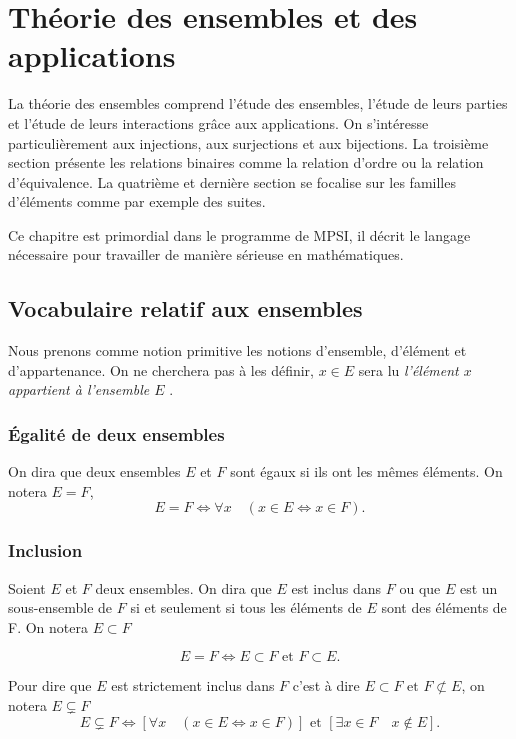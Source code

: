 \chapter{Théorie des ensembles et des applications}
\label{chap:ensembles}
\minitoc
\minilof
\minilot

La théorie des ensembles comprend l'étude des ensembles, l'étude de leurs parties et l'étude de leurs interactions grâce aux applications. On s'intéresse particulièrement aux injections, aux surjections et aux bijections. La troisième section présente les relations binaires comme la relation d'ordre ou la relation d'équivalence. La quatrième et dernière section se focalise sur les familles d'éléments comme par exemple des suites. 

Ce chapitre est primordial dans le programme de MPSI, il décrit le langage nécessaire pour travailler de manière sérieuse en mathématiques.
%
\section{Vocabulaire relatif aux ensembles}
\label{chap3-sec:vocabensemble}
Nous prenons comme notion primitive les notions d'ensemble, d'élément et d'appartenance. On ne cherchera pas à les définir, \og\(x \in E\)\fg{} sera lu \og \emph{l'élément \(x\) appartient à l'ensemble \(E\)} \fg{}.
%
\subsection{Égalité de deux ensembles}
\label{chap3-subsec:egalitededeuxensembles}
\begin{defdef}
  On dira que deux ensembles \(E\) et \(F\) sont égaux si ils ont les mêmes éléments. On notera \(E=F\),
  \begin{equation}
    E=F \iff \forall x \quad \left(x \in E \iff x \in F \right).
  \end{equation}
\end{defdef}
%
\subsection{Inclusion}
\label{chap3-subsec:inclusion}
\begin{defdef}
  Soient \(E\) et \(F\) deux ensembles. On dira que \(E\) est inclus dans \(F\) ou que \(E\) est un sous-ensemble de \(F\) si et seulement si tous les éléments de \(E\) sont des éléments de F. On notera \(E \subset F\)
\end{defdef}
\begin{prop} 
  \begin{equation}
    E=F \iff E \subset F \textrm{~et~} F \subset E.
  \end{equation}
\end{prop}
Pour dire que \(E\) est strictement inclus dans \(F\) c'est à dire \(E \subset F \textrm{~et~} F \not\subset E\), on notera \(E \subsetneq F\)
\begin{equation}
  E \subsetneq F \iff \left[\forall x \quad \left(x \in E \iff x \in F \right) \right] \textrm{~et~} \left[\exists x \in F \quad x \not\in E \right].
\end{equation}
%
